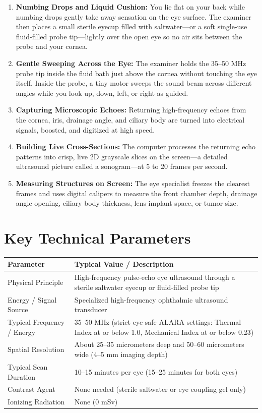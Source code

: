 \begin{enumerate}
    \item \textbf{Numbing Drops and Liquid Cushion:} You lie flat on your back while numbing drops gently take away sensation on the eye surface. The examiner then places a small sterile eyecup filled with saltwater---or a soft single-use fluid-filled probe tip---lightly over the open eye so no air sits between the probe and your cornea.
    \item \textbf{Gentle Sweeping Across the Eye:} The examiner holds the 35--50 MHz probe tip inside the fluid bath just above the cornea without touching the eye itself. Inside the probe, a tiny motor sweeps the sound beam across different angles while you look up, down, left, or right as guided.
    \item \textbf{Capturing Microscopic Echoes:} Returning high-frequency echoes from the cornea, iris, drainage angle, and ciliary body are turned into electrical signals, boosted, and digitized at high speed.
    \item \textbf{Building Live Cross-Sections:} The computer processes the returning echo patterns into crisp, live 2D grayscale slices on the screen---a detailed ultrasound picture called a sonogram---at 5 to 20 frames per second.
    \item \textbf{Measuring Structures on Screen:} The eye specialist freezes the clearest frames and uses digital calipers to measure the front chamber depth, drainage angle opening, ciliary body thickness, lens-implant space, or tumor size.
\end{enumerate}

\section{Key Technical Parameters}

\noindent
\begin{tabularx}{\textwidth}{@{}l X@{}}
\toprule
\textbf{Parameter} & \textbf{Typical Value / Description} \\
\midrule
Physical Principle & High-frequency pulse-echo eye ultrasound through a sterile saltwater eyecup or fluid-filled probe tip \\
Energy / Signal Source & Specialized high-frequency ophthalmic ultrasound transducer \\
Typical Frequency / Energy & 35--50 MHz (strict eye-safe ALARA settings: Thermal Index at or below 1.0, Mechanical Index at or below 0.23) \\
Spatial Resolution & About 25--35 micrometers deep and 50--60 micrometers wide (4--5 mm imaging depth) \\
Typical Scan Duration & 10--15 minutes per eye (15--25 minutes for both eyes) \\
Contrast Agent & None needed (sterile saltwater or eye coupling gel only) \\
Ionizing Radiation & None (0 mSv) \\
\bottomrule
\end{tabularx}

